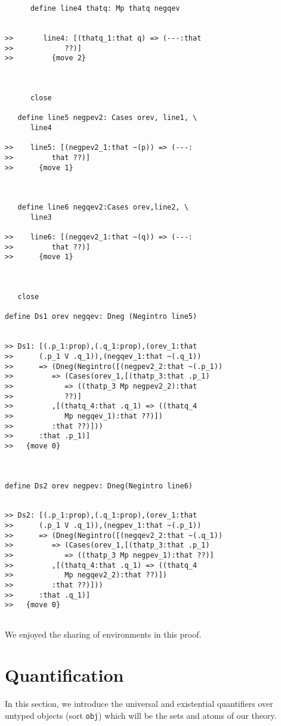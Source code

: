 \documentclass[12pt]{article}
\begin{document}
\begin{verbatim}
      define line4 thatq: Mp thatq negqev


>>       line4: [(thatq_1:that q) => (---:that
>>            ??)]
>>         {move 2}



      close

   define line5 negpev2: Cases orev, line1, \
      line4

>>    line5: [(negpev2_1:that ~(p)) => (---:
>>         that ??)]
>>      {move 1}



   define line6 negqev2:Cases orev,line2, \
      line3

>>    line6: [(negqev2_1:that ~(q)) => (---:
>>         that ??)]
>>      {move 1}



   close

define Ds1 orev negqev: Dneg (Negintro line5)


>> Ds1: [(.p_1:prop),(.q_1:prop),(orev_1:that
>>      (.p_1 V .q_1)),(negqev_1:that ~(.q_1))
>>      => (Dneg(Negintro([(negpev2_2:that ~(.p_1))
>>         => (Cases(orev_1,[(thatp_3:that .p_1)
>>            => ((thatp_3 Mp negpev2_2):that
>>            ??)]
>>         ,[(thatq_4:that .q_1) => ((thatq_4
>>            Mp negqev_1):that ??)])
>>         :that ??)]))
>>      :that .p_1)]
>>   {move 0}



define Ds2 orev negpev: Dneg(Negintro line6)


>> Ds2: [(.p_1:prop),(.q_1:prop),(orev_1:that
>>      (.p_1 V .q_1)),(negpev_1:that ~(.p_1))
>>      => (Dneg(Negintro([(negqev2_2:that ~(.q_1))
>>         => (Cases(orev_1,[(thatp_3:that .p_1)
>>            => ((thatp_3 Mp negpev_1):that ??)]
>>         ,[(thatq_4:that .q_1) => ((thatq_4
>>            Mp negqev2_2):that ??)])
>>         :that ??)]))
>>      :that .q_1)]
>>   {move 0}


\end{verbatim}

We enjoyed the sharing of environments in this proof.


\section{Quantification}

In this section, we introduce the universal and existential quantifiers over untyped objects (sort {\tt obj}) which will be the sets and atoms of our theory.
\end{document}
